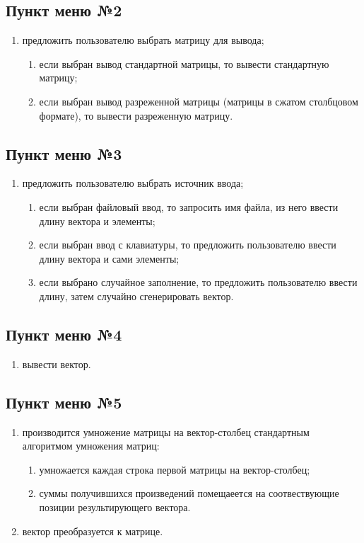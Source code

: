 \documentclass[a4paper,12pt]{extarticle}
\begin{document}
\subsection{Пункт меню №2}
\begin{enumerate}
    \item предложить пользователю выбрать матрицу для вывода;
    \begin{enumerate}
        \item если выбран вывод стандартной матрицы, то вывести стандартную матрицу;
        \item если выбран вывод разреженной матрицы (матрицы в сжатом столбцовом формате), то вывести разреженную матрицу.
    \end{enumerate}
\end{enumerate}

\subsection{Пункт меню №3}
\begin{enumerate}
    \item предложить пользователю выбрать источник ввода;
    \begin{enumerate}
        \item если выбран файловый ввод, то запросить имя файла, из него ввести длину вектора и элементы;
        \item если выбран ввод с клавиатуры, то предложить пользователю ввести длину вектора и сами элементы;
        \item если выбрано случайное заполнение, то предложить пользователю ввести длину, затем случайно сгенерировать вектор.
    \end{enumerate}
\end{enumerate}

\subsection{Пункт меню №4}
\begin{enumerate}
    \item вывести вектор.
\end{enumerate}

\subsection{Пункт меню №5}
\begin{enumerate}
    \item производится умножение матрицы на вектор-столбец стандартным алгоритмом умножения матриц:
    \begin{enumerate}
        \item умножается каждая строка первой матрицы на вектор-столбец;
        \item суммы получившихся произведений помещаеется на соотвествующие позиции результирующего вектора.
    \end{enumerate}
    \item вектор преобразуется к матрице.
\end{enumerate}
\end{document}
